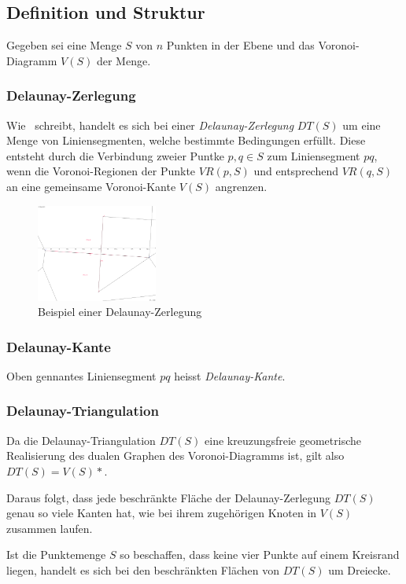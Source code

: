 \subsection{Definition und Struktur}
Gegeben sei eine Menge $S$ von $n$ Punkten in der Ebene und das Voronoi-Diagramm $V(S)$ der Menge.

\subsubsection{Delaunay-Zerlegung}
Wie~\cite{klein2005algorithmischegeometrie} schreibt, handelt es sich bei einer \textit{Delaunay-Zerlegung} $DT(S)$ um eine Menge von Liniensegmenten, welche bestimmte Bedingungen erfüllt. Diese entsteht durch die Verbindung zweier Puntke $p,q \in S$ zum Liniensegment $pq$, wenn die Voronoi-Regionen der Punkte $VR(p,S)$ und entsprechend $VR(q,S)$ an eine gemeinsame Voronoi-Kante $V(S)$ angrenzen.

\begin{figure}[h]
\centering
\includegraphics[width=150px]{images/delaunay_zerlegung_beispiel.png}
\caption{Beispiel einer Delaunay-Zerlegung}
\label{fig:delaunayPartition}
\end{figure}

\subsubsection{Delaunay-Kante}
Oben gennantes Liniensegment $pq$ heisst \textit{Delaunay-Kante}.

\subsubsection{Delaunay-Triangulation}
Da die Delaunay-Triangulation $DT(S)$ eine kreuzungsfreie geometrische Realisierung des dualen Graphen des Voronoi-Diagramms ist, gilt also $DT(S) = V(S)*$.

Daraus folgt, dass jede beschränkte Fläche der Delaunay-Zerlegung $DT(S)$ genau so viele Kanten hat, wie bei ihrem zugehörigen Knoten in $V(S)$ zusammen laufen.

Ist die Punktemenge $S$ so beschaffen, dass keine vier Punkte auf einem Kreisrand liegen, handelt es sich bei den beschränkten Flächen von $DT(S)$ um Dreiecke.

